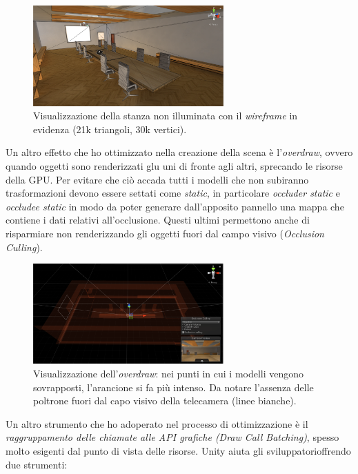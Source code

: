 \begin{figure}[H]
	\includegraphics[width=0.65\textwidth]{figure/RoomWire}
	\centering
	\vspace{0.3cm}
	\caption{Visualizzazione della stanza non illuminata con il \textit{wireframe} in evidenza (21k triangoli, 30k vertici).}
\end{figure}
Un altro effetto che ho ottimizzato nella creazione della scena è l'\textit{overdraw}, ovvero quando oggetti sono renderizzati glu uni di fronte agli altri, sprecando le risorse della GPU. Per evitare che ciò accada tutti i modelli che non subiranno trasformazioni devono essere settati come \textit{static}, in particolare \textit{occluder static} e \textit{occludee static} in modo da poter generare dall'apposito pannello una mappa che contiene i dati relativi all'occlusione. Questi ultimi permettono anche di risparmiare non renderizzando gli oggetti fuori dal campo visivo (\textit{Occlusion Culling}).
\begin{figure}[H]
	\includegraphics[width=0.65\textwidth]{figure/Overdraw}
	\centering
	\vspace{0.3cm}
	\caption{Visualizzazione dell'\textit{overdraw}: nei punti in cui i modelli vengono sovrapposti, l'arancione si fa più intenso. Da notare l'assenza delle poltrone fuori dal capo visivo della telecamera (linee bianche).}
\end{figure}
Un altro strumento che ho adoperato nel processo di ottimizzazione è il \textit{raggruppamento delle chiamate alle API grafiche (Draw Call Batching)}, spesso molto esigenti dal punto di vista delle risorse. Unity aiuta gli sviluppatorioffrendo due strumenti:
